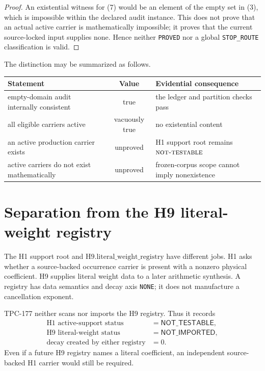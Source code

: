 \documentclass[11pt]{article}
\theoremstyle{definition}
\theoremstyle{remark}
\newcommand{\NT}{\textnormal{\textsc{not-testable}}}
\begin{document}
\begin{proof}
An existential witness for (7) would be an element of the empty set
in (3), which is impossible within the declared audit instance.
This does not prove that an actual active carrier is mathematically
impossible; it proves that the current source-locked input supplies
none.  Hence neither \texttt{PROVED} nor a global
\texttt{STOP\_ROUTE} classification is valid.
\end{proof}

The distinction may be summarized as follows.

\begin{center}
\begin{tabularx}{0.96\linewidth}{@{}l c Y@{}}
\toprule
Statement & Value & Evidential consequence\\
\midrule
empty-domain audit internally consistent & true &
the ledger and partition checks pass\\
all eligible carriers active & vacuously true &
no existential content\\
an active production carrier exists & unproved &
H1 support root remains \(\NT\)\\
active carriers do not exist mathematically & unproved &
frozen-corpus scope cannot imply nonexistence\\
\bottomrule
\end{tabularx}
\end{center}

\section{Separation from the H9 literal-weight registry}

The H1 support root and
\(\mathrm{H9.literal\_weight\_registry}\) have different jobs.  H1
asks whether a source-backed occurrence carrier is present with a
nonzero physical coefficient.  H9 supplies literal weight data to a
later arithmetic synthesis.  A registry has data semantics and
decay axis \texttt{NONE}; it does not manufacture a cancellation
exponent.

TPC-177 neither scans nor imports the H9 registry.  Thus it records
\[
\begin{aligned}
 \text{H1 active-support status}&=\mathsf{NOT\_TESTABLE},\\
 \text{H9 literal-weight status}&=\mathsf{NOT\_IMPORTED},\\
 \text{decay created by either registry}&=0.
\end{aligned}                                                     \tag{8}
\]
Even if a future H9 registry names a literal coefficient, an
independent source-backed H1 carrier would still be required.
\end{document}
